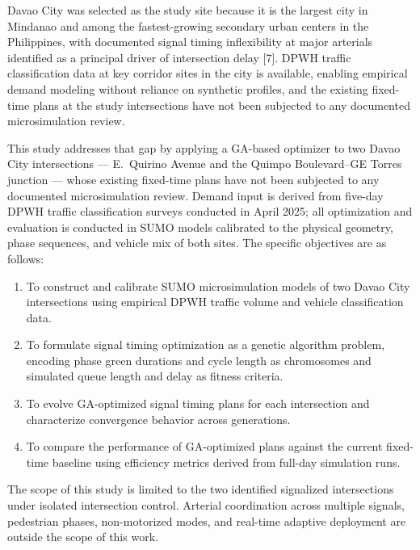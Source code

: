 \documentclass[a4paper,10pt]{article}
\begin{document}
	Davao City was selected as the study site because it is the largest city in Mindanao and among the fastest-growing secondary urban centers in the Philippines, with documented signal timing inflexibility at major arterials identified as a principal driver of intersection delay [7]. DPWH traffic classification data at key corridor sites in the city is available, enabling empirical demand modeling without reliance on synthetic profiles, and the existing fixed-time plans at the study intersections have not been subjected to any documented microsimulation review.

	This study addresses that gap by applying a GA-based optimizer to two Davao City intersections --- E.~Quirino Avenue and the Quimpo Boulevard--GE Torres junction --- whose existing fixed-time plans have not been subjected to any documented microsimulation review. Demand input is derived from five-day DPWH traffic classification surveys conducted in April 2025; all optimization and evaluation is conducted in SUMO models calibrated to the physical geometry, phase sequences, and vehicle mix of both sites. The specific objectives are as follows:
	
	\begin{enumerate}
		\item To construct and calibrate SUMO microsimulation models of two Davao City intersections using empirical DPWH traffic volume and vehicle classification data.
		\item To formulate signal timing optimization as a genetic algorithm problem, encoding phase green durations and cycle length as chromosomes and simulated queue length and delay as fitness criteria.
		\item To evolve GA-optimized signal timing plans for each intersection and characterize convergence behavior across generations.
		\item To compare the performance of GA-optimized plans against the current fixed-time baseline using efficiency metrics derived from full-day simulation runs.
	\end{enumerate}

	The scope of this study is limited to the two identified signalized intersections under isolated intersection control. Arterial coordination across multiple signals, pedestrian phases, non-motorized modes, and real-time adaptive deployment are outside the scope of this work.

\end{document}
